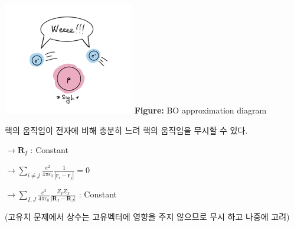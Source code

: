 \documentclass[11pt]{article}
\begin{document}
\begin{enumerate}[label=3)]
\begin{enumerate}[label=\(\mathrm{i}\))]
\begin{tcolorbox}[enhanced, breakable, colback=gray!10, colframe=black, title=Definition: Born-oppenheimer Approximation]
\begin{minipage}[t]{0.48\textwidth}
  \vspace*{0pt} %
  \centering
  \includegraphics[width=\linewidth]{fig/BOapprox.png}
  \vspace{6pt}
  \textbf{Figure:} BO approximation diagram
\end{minipage}
\hfill
\begin{minipage}[t]{0.48\textwidth}
  \vspace*{10pt} %
  핵의 움직임이 전자에 비해 충분히 느려 핵의 움직임을 무시할 수 있다. 

\vspace*{8pt}

\(\rightarrow \mathbf{R}_I\) : Constant

\vspace{\baselineskip}

\(\rightarrow \sum_{i \ne j} \frac{e^2}{4 \pi \epsilon_0} \frac{1}{|\mathbf{r}_i - \mathbf{r}_j|} = 0\) 

\vspace{\baselineskip}

\(\rightarrow \sum_{I,J} \frac{e^2}{4 \pi \epsilon_0} \frac{Z_I Z_J}{|\mathbf{R}_I - \mathbf{R}_J|}\) : Constant

\vspace*{5pt}

(고유치 문제에서 상수는 고유벡터에 영향을 주지 않으므로 무시 하고 나중에 고려)


\end{minipage}
\end{tcolorbox}
\end{enumerate}
\end{enumerate}
\end{document}
